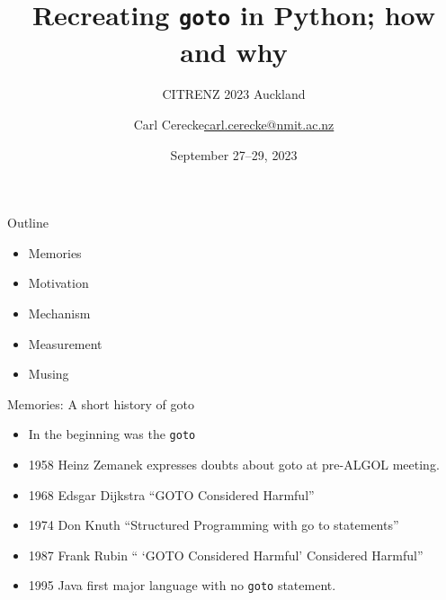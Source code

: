 \documentclass{beamer}
\title{Recreating \texttt{goto} in Python; how and why}
\subtitle{CITRENZ 2023 Auckland}
\author{\texorpdfstring{Carl Cerecke\newline\url{carl.cerecke@nmit.ac.nz}}{Carl Cerecke}}
\institute{https://github.com/cdjc/goto}
\date{September 27--29, 2023}
\begin{document}
\begin{frame}[plain]
    \titlepage
\end{frame}


\begin{frame}{Outline}
\begin{itemize}
    \item Memories
    \item Motivation
    \item Mechanism
    \item Measurement
    \item Musing
\end{itemize}

\end{frame}

\begin{frame}{Memories: A short history of goto}

\begin{itemize}
\item In the beginning was the \texttt{goto}
\item 1958 Heinz Zemanek expresses doubts about goto at pre-ALGOL meeting.
\item 1968 Edsgar Dijkstra ``GOTO Considered Harmful''
\item 1974 Don Knuth ``Structured Programming with go to statements''
\item 1987 Frank Rubin `` `GOTO Considered Harmful' Considered Harmful''
\item 1995 Java first major language with no \texttt{goto} statement.
\end{itemize}

\end{frame}
\end{document}
